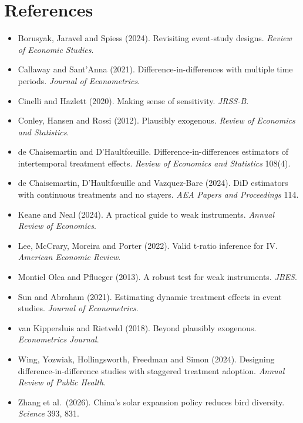 \documentclass[11pt]{article}
\begin{document}
\section{References}
\small
\begin{itemize}[leftmargin=14pt,itemsep=1pt]
\item Borusyak, Jaravel and Spiess (2024). Revisiting event-study designs. \textit{Review of Economic Studies}.
\item Callaway and Sant'Anna (2021). Difference-in-differences with multiple time periods. \textit{Journal of Econometrics}.
\item Cinelli and Hazlett (2020). Making sense of sensitivity. \textit{JRSS-B}.
\item Conley, Hansen and Rossi (2012). Plausibly exogenous. \textit{Review of Economics and Statistics}.
\item de Chaisemartin and D'Haultf\oe uille. Difference-in-differences estimators of intertemporal treatment effects. \textit{Review of Economics and Statistics} 108(4).
\item de Chaisemartin, D'Haultf\oe uille and Vazquez-Bare (2024). DiD estimators with continuous treatments and no stayers. \textit{AEA Papers and Proceedings} 114.
\item Keane and Neal (2024). A practical guide to weak instruments. \textit{Annual Review of Economics}.
\item Lee, McCrary, Moreira and Porter (2022). Valid t-ratio inference for IV. \textit{American Economic Review}.
\item Montiel Olea and Pflueger (2013). A robust test for weak instruments. \textit{JBES}.
\item Sun and Abraham (2021). Estimating dynamic treatment effects in event studies. \textit{Journal of Econometrics}.
\item van Kippersluis and Rietveld (2018). Beyond plausibly exogenous. \textit{Econometrics Journal}.
\item Wing, Yozwiak, Hollingsworth, Freedman and Simon (2024). Designing difference-in-difference studies with staggered treatment adoption. \textit{Annual Review of Public Health}.
\item Zhang et al.\ (2026). China's solar expansion policy reduces bird diversity. \textit{Science} 393, 831.
\end{itemize}
\end{document}

